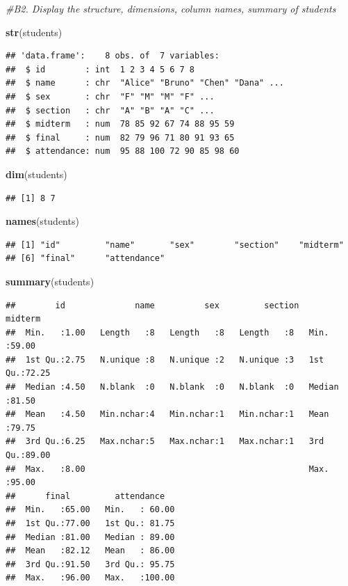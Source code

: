 \documentclass[
]{article}
\newenvironment{Shaded}{\begin{snugshade}}{\end{snugshade}}
\newcommand{\CommentTok}[1]{\textcolor[rgb]{0.56,0.35,0.01}{\textit{#1}}}
\newcommand{\FunctionTok}[1]{\textcolor[rgb]{0.13,0.29,0.53}{\textbf{#1}}}
\newcommand{\NormalTok}[1]{#1}
\begin{document}
\begin{Shaded}
\begin{Highlighting}[]
\CommentTok{\#B2. Display the structure, dimensions, column names, summary of students}

\FunctionTok{str}\NormalTok{(students)}
\end{Highlighting}
\end{Shaded}

\begin{verbatim}
## 'data.frame':    8 obs. of  7 variables:
##  $ id        : int  1 2 3 4 5 6 7 8
##  $ name      : chr  "Alice" "Bruno" "Chen" "Dana" ...
##  $ sex       : chr  "F" "M" "M" "F" ...
##  $ section   : chr  "A" "B" "A" "C" ...
##  $ midterm   : num  78 85 92 67 74 88 95 59
##  $ final     : num  82 79 96 71 80 91 93 65
##  $ attendance: num  95 88 100 72 90 85 98 60
\end{verbatim}

\begin{Shaded}
\begin{Highlighting}[]
\FunctionTok{dim}\NormalTok{(students)}
\end{Highlighting}
\end{Shaded}

\begin{verbatim}
## [1] 8 7
\end{verbatim}

\begin{Shaded}
\begin{Highlighting}[]
\FunctionTok{names}\NormalTok{(students)}
\end{Highlighting}
\end{Shaded}

\begin{verbatim}
## [1] "id"         "name"       "sex"        "section"    "midterm"   
## [6] "final"      "attendance"
\end{verbatim}

\begin{Shaded}
\begin{Highlighting}[]
\FunctionTok{summary}\NormalTok{(students)}
\end{Highlighting}
\end{Shaded}

\begin{verbatim}
##        id              name          sex         section     midterm     
##  Min.   :1.00   Length   :8   Length   :8   Length   :8   Min.   :59.00  
##  1st Qu.:2.75   N.unique :8   N.unique :2   N.unique :3   1st Qu.:72.25  
##  Median :4.50   N.blank  :0   N.blank  :0   N.blank  :0   Median :81.50  
##  Mean   :4.50   Min.nchar:4   Min.nchar:1   Min.nchar:1   Mean   :79.75  
##  3rd Qu.:6.25   Max.nchar:5   Max.nchar:1   Max.nchar:1   3rd Qu.:89.00  
##  Max.   :8.00                                             Max.   :95.00  
##      final         attendance    
##  Min.   :65.00   Min.   : 60.00  
##  1st Qu.:77.00   1st Qu.: 81.75  
##  Median :81.00   Median : 89.00  
##  Mean   :82.12   Mean   : 86.00  
##  3rd Qu.:91.50   3rd Qu.: 95.75  
##  Max.   :96.00   Max.   :100.00
\end{verbatim}
\end{document}
